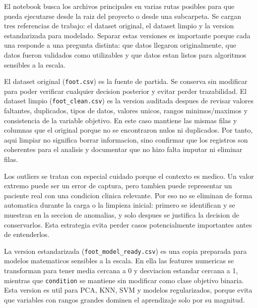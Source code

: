 \documentclass[11pt]{article}
\begin{document}
El notebook busca los archivos principales en varias rutas posibles para
que pueda ejecutarse desde la raiz del proyecto o desde una subcarpeta.
Se cargan tres referencias de trabajo: el dataset original, el dataset
limpio y la version estandarizada para modelado. Separar estas versiones
es importante porque cada una responde a una pregunta distinta: que
datos llegaron originalmente, que datos fueron validados como
utilizables y que datos estan listos para algoritmos sensibles a la
escala.

El dataset original (\texttt{foot.csv}) es la fuente de partida. Se
conserva sin modificar para poder verificar cualquier decision posterior
y evitar perder trazabilidad. El dataset limpio
(\texttt{foot\_clean.csv}) es la version auditada despues de revisar
valores faltantes, duplicados, tipos de datos, valores unicos, rangos
minimos/maximos y consistencia de la variable objetivo. En este caso
mantiene las mismas filas y columnas que el original porque no se
encontraron nulos ni duplicados. Por tanto, aqui limpiar no significa
borrar informacion, sino confirmar que los registros son coherentes para
el analisis y documentar que no hizo falta imputar ni eliminar filas.

Los outliers se tratan con especial cuidado porque el contexto es
medico. Un valor extremo puede ser un error de captura, pero tambien
puede representar un paciente real con una condicion clinica relevante.
Por eso no se eliminan de forma automatica durante la carga o la
limpieza inicial: primero se identifican y se muestran en la seccion de
anomalias, y solo despues se justifica la decision de conservarlos. Esta
estrategia evita perder casos potencialmente importantes antes de
entenderlos.

La version estandarizada (\texttt{foot\_model\_ready.csv}) es una copia
preparada para modelos matematicos sensibles a la escala. En ella las
features numericas se transforman para tener media cercana a 0 y
desviacion estandar cercana a 1, mientras que \texttt{condition} se
mantiene sin modificar como clase objetivo binaria. Esta version es util
para PCA, KNN, SVM y modelos regularizados, porque evita que variables
con rangos grandes dominen el aprendizaje solo por su magnitud.
\end{document}
